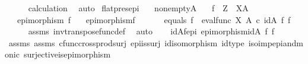 \begin{isabellebody}
\ \ \ \ \isamarkupfalse%
\ calculation\ \isamarkupfalse%
\ auto\isanewline
{}\isamarkupfalse%
%
\endisatagproof
{\isafoldproof}%
%
\isadelimproof
\isanewline
%
\endisadelimproof
\isanewline
{}\isamarkupfalse%
\ flat{\isacharunderscore}{\kern0pt}pres{\isacharunderscore}{\kern0pt}epi{\isacharcolon}{\kern0pt}\isanewline
\ \ \ {\isachardoublequoteopen}nonempty{\isacharparenleft}{\kern0pt}A{\isacharparenright}{\kern0pt}{\isachardoublequoteclose}\isanewline
\ \ \ {\isachardoublequoteopen}f\ {\isacharcolon}{\kern0pt}\ Z\ {\isasymrightarrow}\ X\isactrlbsup A\isactrlesup {\isachardoublequoteclose}\isanewline
\ \ \ {\isachardoublequoteopen}epimorphism\ f{\isachardoublequoteclose}\isanewline
\ \ \ {\isachardoublequoteopen}epimorphism{\isacharparenleft}{\kern0pt}f\isactrlsup {\isasymflat}{\isacharparenright}{\kern0pt}{\isachardoublequoteclose}\isanewline
%
\isadelimproof
%
\endisadelimproof
%
\isatagproof
{}\isamarkupfalse%
\ {\isacharminus}{\kern0pt}\ \isanewline
\ \ \isamarkupfalse%
\ equals{\isacharcolon}{\kern0pt}\ {\isachardoublequoteopen}f\isactrlsup {\isasymflat}\ {\isacharequal}{\kern0pt}\ {\isacharparenleft}{\kern0pt}eval{\isacharunderscore}{\kern0pt}func\ X\ A{\isacharparenright}{\kern0pt}\ {\isasymcirc}\isactrlsub c\ {\isacharparenleft}{\kern0pt}id{\isacharparenleft}{\kern0pt}A{\isacharparenright}{\kern0pt}\ {\isasymtimes}\isactrlsub f\ f{\isacharparenright}{\kern0pt}{\isachardoublequoteclose}\isanewline
\ \ \ \ \isamarkupfalse%
\ assms{\isacharparenleft}{\kern0pt}{}{\isacharparenright}{\kern0pt}\ inv{\isacharunderscore}{\kern0pt}transpose{\isacharunderscore}{\kern0pt}func{\isacharunderscore}{\kern0pt}def{}\ \isamarkupfalse%
\ auto\isanewline
\ \ \isamarkupfalse%
\ idA{\isacharunderscore}{\kern0pt}f{\isacharunderscore}{\kern0pt}epi{\isacharcolon}{\kern0pt}\ {\isachardoublequoteopen}epimorphism{\isacharparenleft}{\kern0pt}{\isacharparenleft}{\kern0pt}id{\isacharparenleft}{\kern0pt}A{\isacharparenright}{\kern0pt}\ {\isasymtimes}\isactrlsub f\ f{\isacharparenright}{\kern0pt}{\isacharparenright}{\kern0pt}{\isachardoublequoteclose}\isanewline
\ \ \ \ \isamarkupfalse%
\ assms{\isacharparenleft}{\kern0pt}{}{\isacharparenright}{\kern0pt}\ assms{\isacharparenleft}{\kern0pt}{}{\isacharparenright}{\kern0pt}\ cfunc{\isacharunderscore}{\kern0pt}cross{\isacharunderscore}{\kern0pt}prod{\isacharunderscore}{\kern0pt}surj\ epi{\isacharunderscore}{\kern0pt}is{\isacharunderscore}{\kern0pt}surj\ id{\isacharunderscore}{\kern0pt}isomorphism\ id{\isacharunderscore}{\kern0pt}type\ iso{\isacharunderscore}{\kern0pt}imp{\isacharunderscore}{\kern0pt}epi{\isacharunderscore}{\kern0pt}and{\isacharunderscore}{\kern0pt}monic\ surjective{\isacharunderscore}{\kern0pt}is{\isacharunderscore}{\kern0pt}epimorphism\ \isamarkupfalse%

\end{isabellebody}
